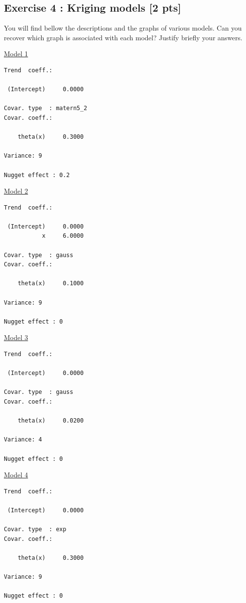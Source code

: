 \documentclass[a4paper,10pt]{article}
\begin{document}
\subsection*{Exercise 4 : Kriging models \hfill [2 pts]}
You will find bellow the descriptions and the graphs of various models. Can you recover which graph is associated with each model? Justify briefly your answers.\\

\hspace{-1.2cm}\begin{minipage}[t]{4.3cm}
\underline{Model 1}
\footnotesize
\begin{Verbatim}
Trend  coeff.:
                       
 (Intercept)     0.0000

Covar. type  : matern5_2 
Covar. coeff.:
                       
    theta(x)     0.3000

Variance: 9

Nugget effect : 0.2
\end{Verbatim}
\end{minipage}
\begin{minipage}[t]{4.3cm}
\underline{Model 2}
\footnotesize
\begin{Verbatim}
Trend  coeff.:
                       
 (Intercept)     0.0000
           x     6.0000

Covar. type  : gauss 
Covar. coeff.:
                       
    theta(x)     0.1000

Variance: 9

Nugget effect : 0
\end{Verbatim}
\end{minipage}
\begin{minipage}[t]{4.3cm}
\underline{Model 3}
\footnotesize
\begin{Verbatim}
Trend  coeff.:
                       
 (Intercept)     0.0000

Covar. type  : gauss 
Covar. coeff.:
                       
    theta(x)     0.0200

Variance: 4

Nugget effect : 0
\end{Verbatim}
\end{minipage}
\begin{minipage}[t]{4.3cm}
\underline{Model 4}
\footnotesize
\begin{Verbatim}
Trend  coeff.:
                       
 (Intercept)     0.0000

Covar. type  : exp 
Covar. coeff.:
                       
    theta(x)     0.3000

Variance: 9

Nugget effect : 0
\end{Verbatim}
\end{minipage}
\end{document}
